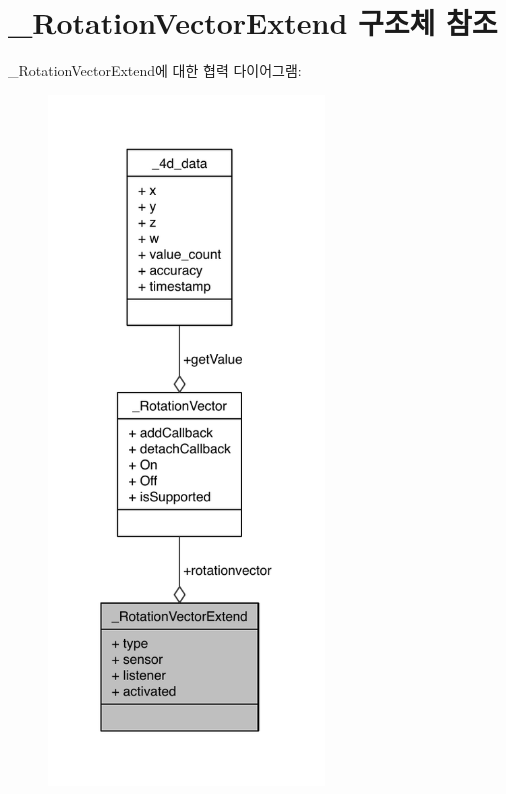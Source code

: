 \hypertarget{struct__RotationVectorExtend}{\section{\-\_\-\-Rotation\-Vector\-Extend 구조체 참조}
\label{struct__RotationVectorExtend}
}


\-\_\-\-Rotation\-Vector\-Extend에 대한 협력 다이어그램\-:\nopagebreak
\begin{figure}[H]
\begin{center}
\leavevmode
\includegraphics[width=208pt]{d6/d29/struct__RotationVectorExtend__coll__graph}
\end{center}
\end{figure}
